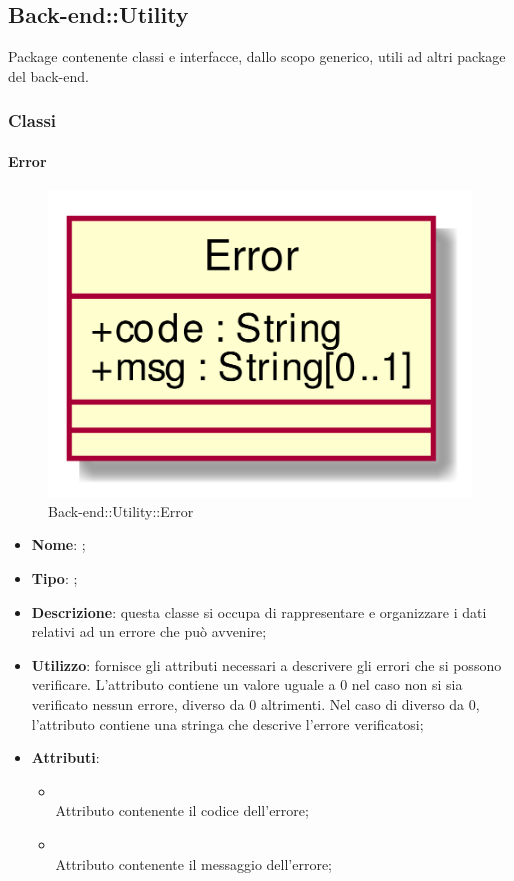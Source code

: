\subsection{Back-end::Utility}
Package contenente classi e interfacce, dallo scopo generico, utili ad altri package del back-end.
\subsubsection{Classi}
\hypertarget{Error_label}{\paragraph{Error}}
\begin{figure}[h]
	\centering
	\includegraphics[width=\textwidth,height=\textheight,keepaspectratio]{images/ClassError.png}
	\caption{Back-end::Utility::Error}
\end{figure}
\begin{itemize}
	\item \textbf{Nome}: ;
	\item \textbf{Tipo}: ;
	\item \textbf{Descrizione}: questa classe si occupa di rappresentare e organizzare i dati relativi ad un errore che può avvenire;
	\item \textbf{Utilizzo}: fornisce gli attributi necessari a descrivere gli errori che si possono verificare.
L'attributo  contiene un valore uguale a 0 nel caso non si sia verificato nessun errore, diverso da 0 altrimenti.
Nel caso di  diverso da 0, l'attributo  contiene una stringa che descrive l'errore verificatosi;
	\item \textbf{Attributi}:
	\begin{itemize}
		\item[]  \\
		Attributo contenente il codice dell'errore;
		\item[]  \\
		Attributo contenente il messaggio dell'errore;
	\end{itemize}
\end{itemize}

